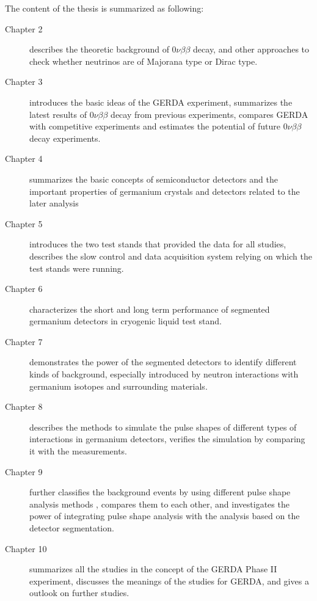 The content of the thesis is summarized as following:
\begin{description}
\item[Chapter 2] describes the theoretic background of   $0\nu\beta\beta$ decay, and other approaches to check whether   neutrinos are of Majorana type or Dirac type.
\item[Chapter 3] introduces the basic ideas of the GERDA experiment,
  summarizes the latest results of $0\nu\beta\beta$ decay from
  previous experiments, compares GERDA with competitive experiments
  and estimates the potential of future $0\nu\beta\beta$ decay
  experiments.
\item[Chapter 4] summarizes the basic concepts of semiconductor
  detectors and the important properties of germanium crystals and
  detectors related to the later analysis
\item[Chapter 5] introduces the two test stands that provided the data
  for all studies, describes the slow control and data acquisition
  system relying on which the test stands were running.
\item[Chapter 6] characterizes the short and long term performance of
  segmented germanium detectors in cryogenic liquid test stand.
\item[Chapter 7] demonstrates the power of the segmented detectors to
  identify different kinds of background, especially introduced by
  neutron interactions with germanium isotopes and surrounding
  materials.
\item[Chapter 8] describes the methods to simulate the pulse shapes of
  different types of interactions in germanium detectors, verifies the
  simulation by comparing it with the measurements.
\item[Chapter 9] further classifies the background events by using
  different pulse shape analysis methods , compares them to each
  other, and investigates the power of integrating pulse shape
  analysis with the analysis based on the detector segmentation.
\item[Chapter 10] summarizes all the studies in the concept of the
  GERDA Phase II experiment, discusses the meanings of the studies for
  GERDA, and gives a outlook on further studies.
\end{description}

